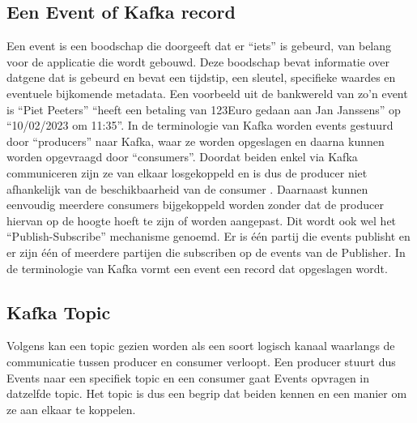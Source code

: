 \subsection{Een Event of Kafka record}
Een event is een boodschap die doorgeeft dat er ``iets'' is gebeurd, van belang voor de applicatie die wordt gebouwd. Deze boodschap bevat informatie over datgene dat is gebeurd en bevat een tijdstip, een sleutel, specifieke waardes en eventuele bijkomende metadata. Een voorbeeld uit de bankwereld van zo'n event is ``Piet Peeters'' ``heeft een betaling van 123Euro gedaan aan Jan Janssens'' op ``10/02/2023 om 11:35''.
\newline
In de terminologie van Kafka worden events gestuurd door ``producers'' naar Kafka, waar ze worden opgeslagen en daarna kunnen worden opgevraagd door ``consumers''. Doordat beiden enkel via Kafka communiceren zijn ze van elkaar losgekoppeld en is dus de producer niet afhankelijk van de beschikbaarheid van de consumer \autocite{Kafka2023}.
\newline
Daarnaast kunnen eenvoudig meerdere consumers bijgekoppeld worden zonder dat de producer hiervan op de hoogte hoeft te zijn of worden aangepast.
\newline
Dit wordt ook wel het ``Publish-Subscribe'' mechanisme genoemd. Er is \'e\'en partij die events publisht en er zijn \'e\'en of meerdere partijen die subscriben op de events van de Publisher.
In de terminologie van Kafka vormt een event een record dat opgeslagen wordt.


\subsection{Kafka Topic}
Volgens \textcite{Harbour2023} kan een topic gezien worden als een soort logisch kanaal waarlangs de communicatie tussen producer en consumer verloopt. Een producer stuurt dus Events naar een specifiek topic en een consumer gaat Events opvragen in datzelfde topic. Het topic is dus een begrip dat beiden kennen en een manier om ze aan elkaar te koppelen.


